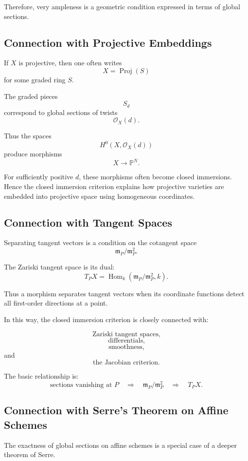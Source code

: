 \documentclass[12pt,a4paper]{article}
\theoremstyle{notespace}
\begin{document}
Therefore, very ampleness is a geometric condition expressed in terms of global sections.

\subsection{Connection with Projective Embeddings}

If \(X\) is projective, then one often writes
\[
X=\operatorname{Proj}(S)
\]
for some graded ring \(S\).

The graded pieces
\[
S_d
\]
correspond to global sections of twists
\[
\mathcal O_X(d).
\]

Thus the spaces
\[
H^0(X,\mathcal O_X(d))
\]
produce morphisms
\[
X\to \mathbb P^N.
\]

For sufficiently positive \(d\), these morphisms often become closed immersions. Hence the closed immersion criterion explains how projective varieties are embedded into projective space using homogeneous coordinates.

\subsection{Connection with Tangent Spaces}

Separating tangent vectors is a condition on the cotangent space
\[
\mathfrak m_P/\mathfrak m_P^2.
\]

The Zariski tangent space is its dual:
\[
T_PX
=
\operatorname{Hom}_k
\left(
\mathfrak m_P/\mathfrak m_P^2,
k
\right).
\]

Thus a morphism separates tangent vectors when its coordinate functions detect all first-order directions at a point.

In this way, the closed immersion criterion is closely connected with:

\[
\text{Zariski tangent spaces,}
\]
\[
\text{differentials,}
\]
\[
\text{smoothness,}
\]
and
\[
\text{the Jacobian criterion.}
\]

The basic relationship is:
\[
\boxed{
	\text{sections vanishing at }P
	\quad\Longrightarrow\quad
	\mathfrak m_P/\mathfrak m_P^2
	\quad\Longrightarrow\quad
	T_PX.
}
\]

\subsection{Connection with Serre's Theorem on Affine Schemes}

The exactness of global sections on affine schemes is a special case of a deeper theorem of Serre.
\end{document}
